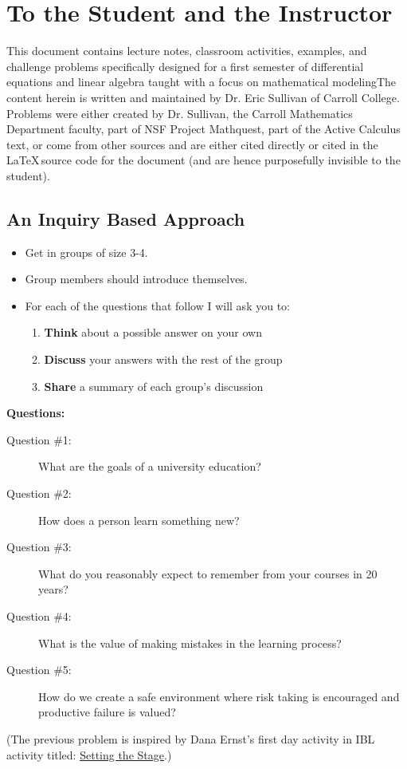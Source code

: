 \setcounter{chapter}{-1}
\chapter{To the Student and the Instructor}
This document contains lecture notes, classroom activities, examples, and challenge
problems specifically designed for a first semester of differential equations and linear
algebra taught with a focus on mathematical modelingThe content herein is written and
maintained by Dr. Eric Sullivan of Carroll College.  Problems were either created by Dr.
Sullivan, the Carroll Mathematics Department faculty, part of NSF Project Mathquest, part
of the Active Calculus text, or come from other sources and are either cited directly or
cited in the \LaTeX\,source code for the document (and are hence purposefully invisible to
the student).


\section{An Inquiry Based Approach}
\begin{problem}
    \begin{itemize}
        \item Get in groups of size 3-4.
        \item Group members should introduce themselves.
        \item For each of the questions that follow I will ask you to:
            \begin{enumerate}
                \item {\bf Think} about a possible answer on your own
                \item {\bf Discuss} your answers with the rest of the group
                \item {\bf Share} a summary of each group's discussion
            \end{enumerate}
    \end{itemize}
    {\bf Questions:} 
    \begin{description}
        \item[Question \#1:] What are the goals of a university education?
        \item[Question \#2:] How does a person learn something new?
        \item[Question \#3:] What do you reasonably expect to remember from your courses
            in 20 years?
        \item[Question \#4:] What is the value of making mistakes in the learning process?
        \item[Question \#5:] How do we create a safe environment where risk taking is
            encouraged and productive failure is valued?
    \end{description}
\end{problem}
(The previous problem is inspired by Dana Ernst's first day activity in IBL activity
titled: 
\href{http://danaernst.com/setting-the-stage/}{Setting the Stage}.)

